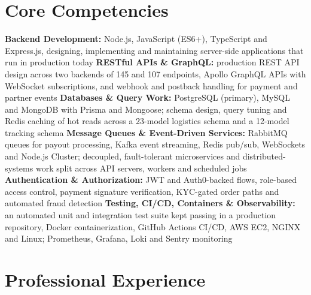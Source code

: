 \documentclass[11pt,a4paper,sans]{moderncv}
\begin{document}
\section{Core Competencies}
\vspace{1pt}
\raggedright
\textbf{Backend Development:} Node.js, JavaScript (ES6+), TypeScript and Express.js, designing, implementing and maintaining server-side applications that run in production today \textbar{}
\textbf{RESTful APIs \& GraphQL:} production REST API design across two backends of 145 and 107 endpoints, Apollo GraphQL APIs with WebSocket subscriptions, and webhook and postback handling for payment and partner events \textbar{}
\textbf{Databases \& Query Work:} PostgreSQL (primary), MySQL and MongoDB with Prisma and Mongoose; schema design, query tuning and Redis caching of hot reads across a 23-model logistics schema and a 12-model tracking schema \textbar{}
\textbf{Message Queues \& Event-Driven Services:} RabbitMQ queues for payout processing, Kafka event streaming, Redis pub/sub, WebSockets and Node.js Cluster; decoupled, fault-tolerant microservices and distributed-systems work split across API servers, workers and scheduled jobs \textbar{}
\textbf{Authentication \& Authorization:} JWT and Auth0-backed flows, role-based access control, payment signature verification, KYC-gated order paths and automated fraud detection \textbar{}
\textbf{Testing, CI/CD, Containers \& Observability:} an automated unit and integration test suite kept passing in a production repository, Docker containerization, GitHub Actions CI/CD, AWS EC2, NGINX and Linux; Prometheus, Grafana, Loki and Sentry monitoring
\par\normalfont


\section{Professional Experience}
\vspace{3pt}
\end{document}
